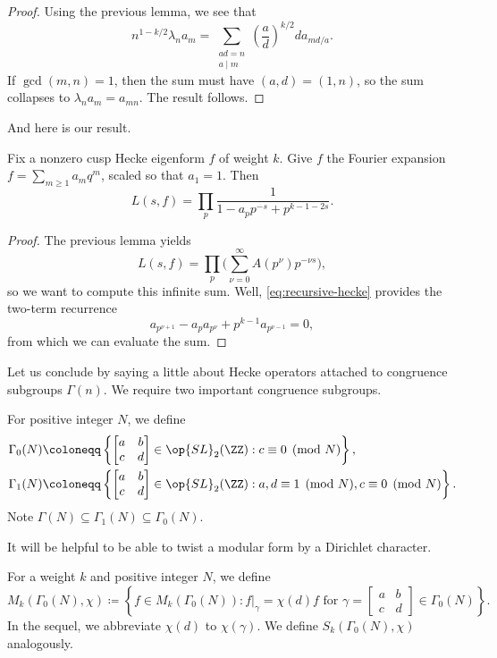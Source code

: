 \documentclass{article}
\begin{document}
\begin{proof}
	Using the previous lemma, we see that
	\begin{equation}
		n^{1-k/2}\lambda_na_m=\sum_{\substack{ad=n\\a\mid m}}\left(\frac ad\right)^{k/2}da_{md/a}. \label{eq:recursive-hecke}
	\end{equation}
	If $\gcd(m,n)=1$, then the sum must have $(a,d)=(1,n)$, so the sum collapses to $\lambda_na_m=a_{mn}$. The result follows.
\end{proof}
And here is our result.
\begin{theorem}
	Fix a nonzero cusp Hecke eigenform $f$ of weight $k$. Give $f$ the Fourier expansion $f=\sum_{m\ge1}a_mq^m$, scaled so that $a_1=1$. Then
	\[L(s,f)=\prod_p\frac1{1-a_pp^{-s}+p^{k-1-2s}}.\]
\end{theorem}
\begin{proof}
	The previous lemma yields
	\[L(s,f)=\prod_p\Bigg(\sum_{\nu=0}^\infty A\left(p^\nu\right)p^{-\nu s}\Bigg),\]
	so we want to compute this infinite sum. Well, \eqref{eq:recursive-hecke} provides the two-term recurrence
	\[a_{p^{\nu+1}}-a_pa_{p^\nu}+p^{k-1}a_{p^{\nu-1}}=0,\]
	from which we can evaluate the sum.
\end{proof}
Let us conclude by saying a little about Hecke operators attached to congruence subgroups $\Gamma(n)$. We require two important congruence subgroups.
\begin{definition}
	For positive integer $N$, we define
	\begin{align*}
		\Gamma_0(N) &\coloneqq \left\{\begin{bmatrix}
			a & b \\ c & d
		\end{bmatrix}\in\op{SL}_2(\ZZ):c\equiv0\pmod N\right\}, \\
		\Gamma_1(N) &\coloneqq \left\{\begin{bmatrix}
			a & b \\ c & d
		\end{bmatrix}\in\op{SL}_2(\ZZ):a,d\equiv1\pmod N,c\equiv0\pmod N\right\}.
	\end{align*}
	Note $\Gamma(N)\subseteq\Gamma_1(N)\subseteq\Gamma_0(N)$.
\end{definition}
It will be helpful to be able to twist a modular form by a Dirichlet character.
\begin{definition}
	For a weight $k$ and positive integer $N$, we define
	\[M_k(\Gamma_0(N),\chi)\coloneqq\left\{f\in M_k(\Gamma_0(N)):f|_\gamma=\chi(d)f\text{ for }\gamma=\begin{bmatrix}
		a & b \\ c & d
	\end{bmatrix}\in\Gamma_0(N)\right\}.\]
	In the sequel, we abbreviate $\chi(d)$ to $\chi(\gamma)$. We define $S_k(\Gamma_0(N),\chi)$ analogously.
\end{definition}
\end{document}
